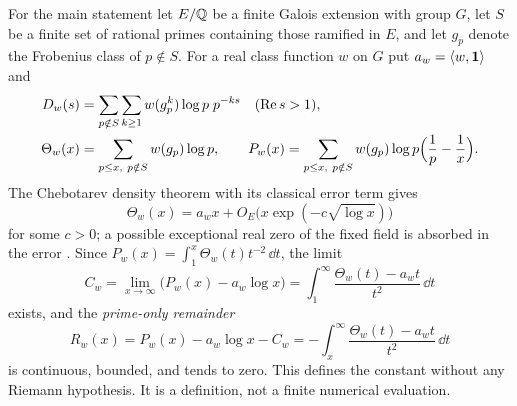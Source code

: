 For the main statement let $E/\Q$ be a finite Galois extension with group $G$, let $S$ be a
finite set of rational primes containing those ramified in $E$, and let $g_p$ denote the
Frobenius class of $p\notin S$. For a real class function $w$ on $G$ put
$a_w=\langle w,\triv\rangle$ and
\begin{align*}
 D_w(s)&=\sum_{p\notin S}\sum_{k\ge1}w(g_p^k)\log p\;p^{-ks}\quad(\Re s>1),\\
 \Theta_w(x)&=\sum_{p\le x,\ p\notin S}w(g_p)\log p,\qquad
 P_w(x)=\sum_{p\le x,\ p\notin S}w(g_p)\log p\Bigl(\frac1p-\frac1x\Bigr).
\end{align*}
The Chebotarev density theorem with its classical error term gives
\[
 \Theta_w(x)=a_wx+O_E\bigl(x\exp(-c\sqrt{\log x})\bigr)
\]
for some $c>0$; a possible exceptional real zero of the fixed field is absorbed in the error
\cite{LagariasOdlyzko1977Effective}. Since $P_w(x)=\int_1^x\Theta_w(t)t^{-2}\,\dd t$, the limit
\[
 C_w=\lim_{x\to\infty}\bigl(P_w(x)-a_w\log x\bigr)
 =\int_1^\infty\frac{\Theta_w(t)-a_wt}{t^2}\,\dd t
\]
exists, and the \emph{prime-only remainder}
\begin{equation}\label{ana:eq:Rw}
 R_w(x)=P_w(x)-a_w\log x-C_w=-\int_x^\infty\frac{\Theta_w(t)-a_wt}{t^2}\,\dd t
\end{equation}
is continuous, bounded, and tends to zero. This defines the constant without any Riemann
hypothesis. It is a definition, not a finite numerical evaluation.

